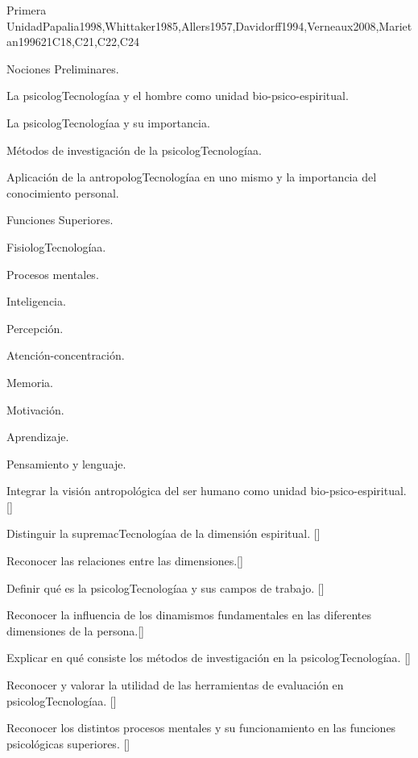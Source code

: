 \begin{syllabus}
\begin{unit}{}{Primera Unidad}{Papalia1998,Whittaker1985,Allers1957,Davidorff1994,Verneaux2008,Marietan1996}{21}{C18,C21,C22,C24}
\begin{topics}
	\item Nociones Preliminares.
	      \begin{subtopics}
		\item La psicologTecnologíaa y el hombre como unidad bio-psico-espiritual.
		\item La psicologTecnologíaa y su importancia.
		\item Métodos de investigación de la psicologTecnologíaa.
		\item Aplicación de la antropologTecnologíaa en uno mismo y la importancia del conocimiento personal.
	      \end{subtopics}
	\item Funciones Superiores.
	      \begin{subtopics}
		\item FisiologTecnologíaa.
		\item Procesos mentales.
		    \begin{subtopics}
			\item	Inteligencia.
			\item Percepción.
			\item Atención-concentración.
			\item Memoria.
			\item Motivación.
			\item Aprendizaje.
			\item Pensamiento y lenguaje.
		    \end{subtopics}    
	      \end{subtopics}

\end{topics}
\begin{learningoutcomes}
	\item Integrar la visión antropológica del ser humano como unidad bio-psico-espiritual. [\Usage]
	\item Distinguir la supremacTecnologíaa de la dimensión espiritual. [\Familiarity]
	\item Reconocer las relaciones entre las dimensiones.[\Familiarity]
	\item Definir qué es la psicologTecnologíaa y sus campos de trabajo. [\Familiarity]
	\item Reconocer la influencia de los dinamismos fundamentales en las diferentes dimensiones de la persona.[\Familiarity]
	\item Explicar en qué consiste los métodos de investigación en la psicologTecnologíaa. [\Familiarity]
	\item Reconocer y valorar la utilidad de las herramientas de evaluación en psicologTecnologíaa. [\Familiarity]
	\item Reconocer los distintos procesos mentales y su funcionamiento en las funciones psicológicas superiores. [\Familiarity]
\end{learningoutcomes}
\end{unit}


\end{syllabus}
